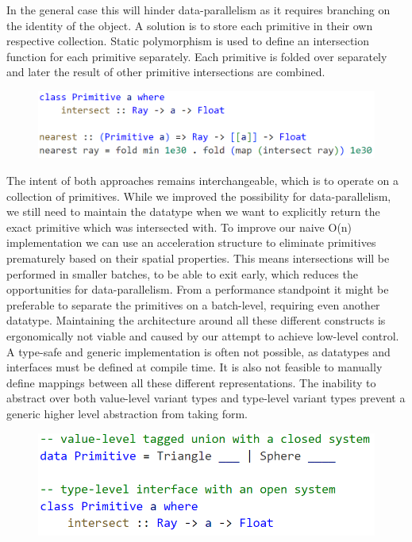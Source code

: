 \documentclass{article}
\newcommand{\type}[1]{\smash{\colorbox{codegray}{\texttt{#1}}}}
\begin{document}
In the general case this will hinder data-parallelism as it requires branching on the identity of the object.
A solution is to store each primitive in their own respective collection.
Static polymorphism is used to define an intersection function for each primitive separately.
Each primitive is folded over separately and later the result of other primitive intersections are combined.

\begin{figure}[ht]
    \hspace{1em}
    \includegraphics[scale=0.45]{CodeIntro3.png}
\end{figure}

The intent of both approaches remains interchangeable, which is to operate on a collection of primitives.
While we improved the possibility for data-parallelism, we still need to maintain the \type{Primitive} datatype when we want to explicitly return the exact primitive which was intersected with.
To improve our naive O(n) implementation we can use an acceleration structure to eliminate primitives prematurely based on their spatial properties.
This means intersections will be performed in smaller batches, to be able to exit early, which reduces the opportunities for data-parallelism.
From a performance standpoint it might be preferable to separate the primitives on a batch-level, requiring even another datatype.
Maintaining the architecture around all these different constructs is ergonomically not viable and caused by our attempt to achieve low-level control.  
A type-safe and generic implementation is often not possible, as datatypes and interfaces must be defined at compile time.
It is also not feasible to manually define mappings between all these different representations.
The inability to abstract over both value-level variant types and type-level variant types prevent a generic higher level abstraction from taking form.

\begin{figure}[ht]
    \hspace{1em}
    \includegraphics[scale=0.45]{CodeIntro4.png}
\end{figure}
\end{document}
